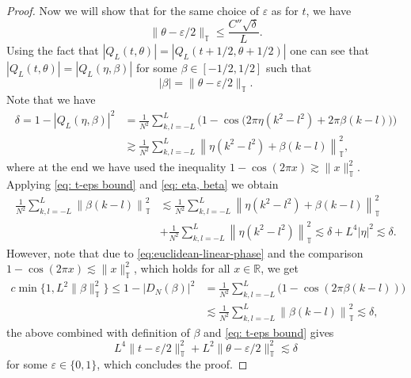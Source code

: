 \documentclass[10pt,a4paper]{amsart}
\newcommand{\T}{\mathbb T}
\begin{document}
\begin{proof}
Now we will show that for the same choice of $\varepsilon$ as for $t$, we have 
\begin{equation*} 
    \| \theta -\varepsilon/2 \|_{\T} \le \frac{C'' \sqrt{\delta}}{L}.
\end{equation*}
Using the fact that $|Q_{L}(t,\theta)|=|Q_{L}(t+ 1/2,\theta+1/2)|$ one can see that 
$|Q_L(t, \theta)|=|Q_L(\eta, \beta)|$ for some $\beta \in [-1/2, 1/2]$ such that 
\begin{equation*}
    |\beta|= \|\theta -\varepsilon/2 \|_{\T}.
\end{equation*}
Note that we have 
\begin{equation}
\label{eq: eta, beta}
\begin{split}
    \delta=1-|Q_L(\eta,\beta)|^2&=\frac{1}{N^2} \sum_{k,l=-L}^{L}\Big(1-\cos\big(2\pi\eta(k^2-l^2)+2\pi\beta(k-l)\big) \Big) \\
    &\gtrsim \frac{1}{N^2} \sum_{k,l=-L}^{L} \left\| \eta(k^2-l^2)+\beta(k-l)\right \|_{\T}^2, 
\end{split}
\end{equation}
where at the end we have used the inequality $1- \cos(2\pi x) \gtrsim  \|x \|_{\T}^2$. Applying \eqref{eq: t-eps bound} and \eqref{eq: eta, beta} we obtain 
\begin{align*}
    \frac{1}{N^2} \sum_{k,l=-L}^{L} \left\| \beta(k-l)\right \|_{\T}^2 &\lesssim \frac{1}{N^2} \sum_{k,l=-L}^{L} \left\| \eta(k^2-l^2)+\beta(k-l)\right \|_{\T}^2 \\
    &+  \frac{1}{N^2} \sum_{k,l=-L}^{L}\left\| \eta(k^2-l^2) \right \|_{\T}^2 \lesssim \delta + L^4 |\eta|^2 \lesssim \delta.
\end{align*}
However, note that due to \eqref{eq:euclidean-linear-phase} and the comparison $1- \cos(2 \pi x) \lesssim \|x \|_{\T}^2$, which holds for all $x \in \mathbb R$, we get
\begin{align*}
    c\min\{1, L^2\|\beta \|_{\T}^2 \} \le1-|D_N(\beta)|^2&=  \frac{1}{N^2} \sum_{k,l=-L}^{L} \big(1-\cos\left(2\pi\beta(k-l) \right) \big)   \\ &\lesssim\frac{1}{N^2} \sum_{k,l=-L}^{L} \left\| \beta(k-l)\right \|_{\T}^2 \lesssim \delta,
\end{align*}
the above combined with definition of $\beta$ and \eqref{eq: t-eps bound} gives 
\begin{equation*}
    L^4\|t - \varepsilon/2 \|_{\T}^2+ L^2 \| \theta - \varepsilon/2 \|_{\T}^2 \lesssim \delta
\end{equation*}
for some $\varepsilon \in \{0,1\}$, which concludes the proof.
\end{proof}
\end{document}
